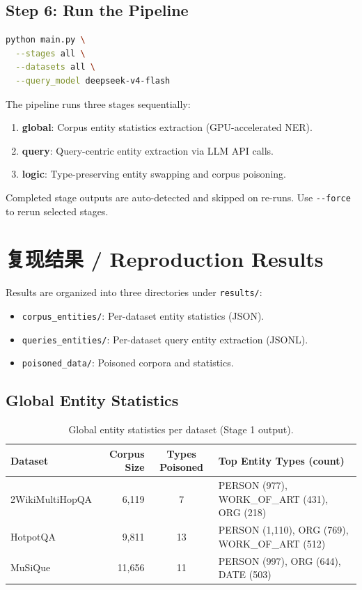 \documentclass[11pt,a4paper]{article}
\begin{document}
\subsection{Step 6: Run the Pipeline}

\begin{lstlisting}[language=bash]
python main.py \
  --stages all \
  --datasets all \
  --query_model deepseek-v4-flash
\end{lstlisting}

The pipeline runs three stages sequentially:
\begin{enumerate}
  \item \textbf{global}: Corpus entity statistics extraction (GPU-accelerated NER).
  \item \textbf{query}: Query-centric entity extraction via LLM API calls.
  \item \textbf{logic}: Type-preserving entity swapping and corpus poisoning.
\end{enumerate}

Completed stage outputs are auto-detected and skipped on re-runs.
Use \texttt{-{}-force} to rerun selected stages.

\section{复现结果 / Reproduction Results}

Results are organized into three directories under \texttt{results/}:
\begin{itemize}[nosep]
  \item \texttt{corpus\_entities/}: Per-dataset entity statistics (JSON).
  \item \texttt{queries\_entities/}: Per-dataset query entity extraction (JSONL).
  \item \texttt{poisoned\_data/}: Poisoned corpora and statistics.
\end{itemize}

\subsection{Global Entity Statistics}

\begin{table}[H]
\centering
\caption{Global entity statistics per dataset (Stage 1 output).}
\begin{tabular}{l r c l}
\toprule
\textbf{Dataset} & \textbf{Corpus Size} & \textbf{Types Poisoned} & \textbf{Top Entity Types (count)} \\
\midrule
2WikiMultiHopQA & 6,119 & 7 & PERSON (977), WORK\_OF\_ART (431), ORG (218) \\
HotpotQA        & 9,811 & 13 & PERSON (1,110), ORG (769), WORK\_OF\_ART (512) \\
MuSiQue         & 11,656 & 11 & PERSON (997), ORG (644), DATE (503) \\
\bottomrule
\end{tabular}
\end{table}
\end{document}
